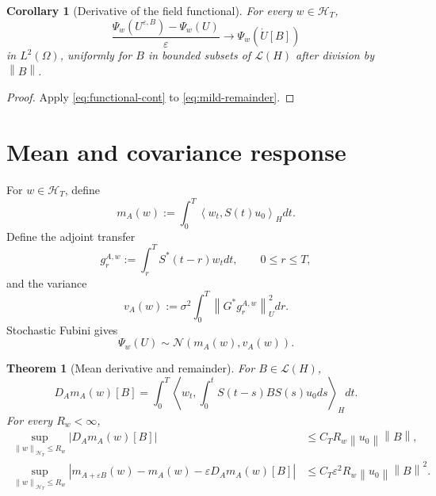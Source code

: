 \documentclass[11pt]{article}
\newtheorem{theorem}[assumption]{Theorem}
\newtheorem{corollary}[assumption]{Corollary}
\theoremstyle{remark}
\newcommand{\cL}{\mathcal L}
\newcommand{\cH}{\mathcal H_T}
\newcommand{\N}{\mathcal N}
\newcommand{\ip}[2]{\left\langle #1,#2\right\rangle}
\newcommand{\norm}[1]{\left\lVert #1\right\rVert}
\newcommand{\abs}[1]{\left\lvert #1\right\rvert}
\begin{document}
\begin{corollary}[Derivative of the field functional]\label{cor:psi-derivative}
For every $w\in\cH$,
\begin{equation}\label{eq:psi-derivative}
 \frac{
 \Psi_w(U^{\varepsilon,B})-\Psi_w(U)
 }{\varepsilon}
 \longrightarrow
 \Psi_w(\dot U[B])
\end{equation}
in $L^2(\Omega)$, uniformly for $B$ in bounded subsets of $\cL(H)$ after division by $\norm{B}$.
\end{corollary}

\begin{proof}
Apply \eqref{eq:functional-cont} to \eqref{eq:mild-remainder}.
\end{proof}

\section{Mean and covariance response}

For $w\in\cH$, define
\begin{equation}\label{eq:mean}
 m_A(w)
 :=
 \int_0^T\ip{w_t}{S(t)u_0}_Hdt.
\end{equation}
Define the adjoint transfer
\begin{equation}\label{eq:g}
 g_r^{A,w}
 :=
 \int_r^TS^*(t-r)w_tdt,
 \qquad 0\le r\le T,
\end{equation}
and the variance
\begin{equation}\label{eq:variance}
 v_A(w)
 :=
 \sigma^2\int_0^T
 \norm{G^*g_r^{A,w}}_U^2dr.
\end{equation}
Stochastic Fubini gives
\begin{equation}\label{eq:Gaussian-law}
 \Psi_w(U)
 \sim
 \N(m_A(w),v_A(w)).
\end{equation}

\begin{theorem}[Mean derivative and remainder]\label{thm:mean-derivative}
For $B\in\cL(H)$,
\begin{equation}\label{eq:Dm}
 D_Am_A(w)[B]
 =
 \int_0^T
 \ip{
 w_t
 }{
 \int_0^tS(t-s)BS(s)u_0ds
 }_Hdt.
\end{equation}
For every $R_w<\infty$,
\begin{align}
 \sup_{\norm{w}_{\cH}\le R_w}
 \abs{D_Am_A(w)[B]}
 &\le C_TR_w\norm{u_0}\norm{B},
 \label{eq:Dm-bound}\\
 \sup_{\norm{w}_{\cH}\le R_w}
 \abs{
 m_{A+\varepsilon B}(w)-m_A(w)
 -\varepsilon D_Am_A(w)[B]
 }
 &\le C_T\varepsilon^2R_w\norm{u_0}\norm{B}^2.
 \label{eq:Dm-remainder}
\end{align}
\end{theorem}
\end{document}
